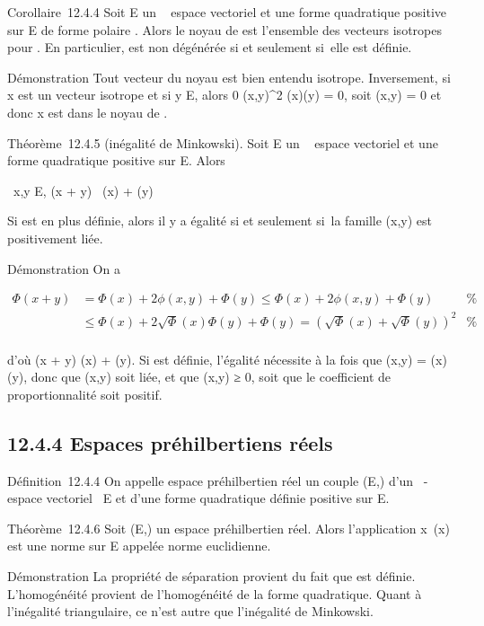 \documentclass[]{article}
\begin{document}
Corollaire~12.4.4 Soit E un ~ espace vectoriel et \Phi une forme
quadratique positive sur E de forme polaire \phi. Alors le noyau de \Phi est
l'ensemble des vecteurs isotropes pour \Phi. En particulier, \Phi est non
dégénérée si et seulement si~elle est définie.

Démonstration Tout vecteur du noyau est bien entendu isotrope.
Inversement, si x est un vecteur isotrope et si y \in E, alors 0 \leq
\phi(x,y)^2 \leq \Phi(x)\Phi(y) = 0, soit \phi(x,y) = 0 et donc x est dans
le noyau de \phi.

Théorème~12.4.5 (inégalité de Minkowski). Soit E un ~ espace vectoriel
et \Phi une forme quadratique positive sur E. Alors

\forall~x,y \in E, \sqrt\Phi(x + y)~
\leq\sqrt\Phi(x) + \sqrt\Phi(y)

Si \Phi est en plus définie, alors il y a égalité si et seulement si~la
famille (x,y) est positivement liée.

Démonstration On a

\begin{align*} \Phi(x + y)& = \Phi(x) + 2\phi(x,y) + \Phi(y) \leq
\Phi(x) + 2\phi(x,y) + \Phi(y)& \%&
\\ & \leq \Phi(x) +
2\sqrt\Phi(x)\Phi(y) + \Phi(y) = \left
(\sqrt\Phi(x) +
\sqrt\Phi(y)\right )^2& \%&
\\ \end{align*}

d'où \sqrt\Phi(x + y) \leq\sqrt\Phi(x) +
\sqrt\Phi(y). Si \Phi est définie, l'égalité nécessite à la
fois que \phi(x,y) = \sqrt\Phi(x)\Phi(y),
donc que (x,y) soit liée, et que \phi(x,y) ≥ 0, soit que le coefficient de
proportionnalité soit positif.

\subsection{12.4.4 Espaces préhilbertiens réels}

Définition~12.4.4 On appelle espace préhilbertien réel un couple (E,\Phi)
d'un ~-espace vectoriel ~E et d'une forme quadratique définie positive
sur E.

Théorème~12.4.6 Soit (E,\Phi) un espace préhilbertien réel. Alors
l'application x\mapsto~\sqrt\Phi(x)
est une norme sur E appelée norme euclidienne.

Démonstration La propriété de séparation provient du fait que \Phi est
définie. L'homogénéité provient de l'homogénéité de la forme
quadratique. Quant à l'inégalité triangulaire, ce n'est autre que
l'inégalité de Minkowski.
\end{document}
